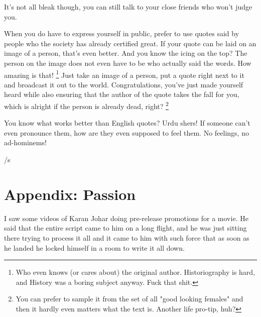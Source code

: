 \documentclass[]{report}
\begin{document}
It's not all bleak though, you can still talk to your close friends  who won't judge you. 

When you do have to express yourself in public, prefer to use quotes said by people who the society has already certified great. If your quote can be laid on an image of a person, that's even better. And you know the icing on the top? The person on the image does not even have to be who actually said the words. How amazing is that! 
\footnote{Who even knows (or cares about) the original author. Historiography is hard, and History was a boring subject anyway. Fuck that shit.}
Just take an image of a person, put a quote right next to it and broadcast it out to the world.
Congratulations, you've just made yourself heard while also ensuring that the author of the quote takes the fall for you, which is alright if the person is already dead, right?
\footnote{You can prefer to sample it from the set of all "good looking females" and then it hardly even matters what the text is. Another life pro-tip, huh?}

You know what works better than English quotes? Urdu shers! 
If someone can't even pronounce them, how are they even supposed to feel them. 
No feelings, no ad-hominems!

/s


\chapter{Appendix: Passion}

I saw some videos of Karan Johar doing pre-release promotions for a movie. 
He said that the entire script came to him on a long flight, and he was just sitting there trying to process it all and it came to him with such force that as soon as he landed he locked himself in a room to write it all down.
\end{document}

